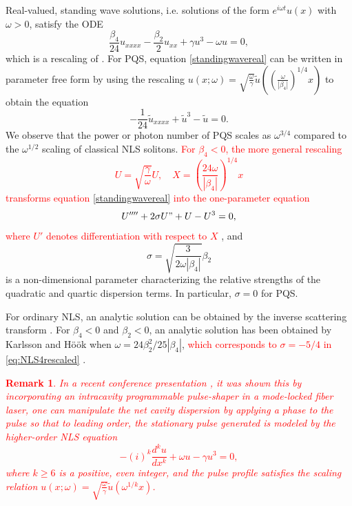 \documentclass[12pt]{elsarticle}
\newtheorem{remark}{Remark}
\newcommand{\revised}[1]{ \textcolor{red}{#1} }
\begin{document}
Real-valued, standing wave solutions, i.e. solutions of the form $e^{i \omega t} u(x)$ with $\omega > 0$, satisfy the ODE 
\begin{equation}\label{standingwavereal}
\frac{\beta_4}{24}u_{xxxx} - \frac{\beta_2}{2}u_{xx} + \gamma u^3 - \omega u = 0,
\end{equation}
which is a rescaling of \cite{champneys1998}. For PQS, equation \cref{standingwavereal} can be written in parameter free form by using the rescaling $
u(x; \omega) = \sqrt{\frac{\omega}{\gamma}} \tilde{u}
\left( \left(\frac{\omega}{|\beta_4|}\right)^{1/4}x \right)
$
to obtain the equation
\begin{equation}\label{PQSparfree}
-\frac{1}{24}\tilde{u}_{xxxx} + \tilde{u}^3 - \tilde{u} = 0.
\end{equation} 
We observe that the power or photon number of PQS scales as $\omega^{3/4}$ compared to the $\omega^{1/2}$ scaling of classical NLS solitons. \revised{For $\beta_4 < 0$, the more general rescaling \cite[Section VI]{Tam2020} 
\begin{equation}\label{rescaling}
U = \sqrt{\frac{\gamma}{\omega}} U, \quad
X = \left( \frac{24 \omega}{|\beta_4|}\right)^{1/4} x
\end{equation}
transforms equation \cref{standingwavereal} into the one-parameter equation
\begin{equation}\label{eq:NLS4rescaled}
U'''' + 2 \sigma U" +  U - U^3 = 0,
\end{equation}
where $U'$ denotes differentiation with respect to $X$}, and 
\begin{equation}\label{eq:sigma}
\sigma = \sqrt{\frac{3}{2 \omega |\beta_4| }}\beta_2
\end{equation}
is a non-dimensional parameter characterizing the relative strengths of the quadratic and quartic dispersion terms. In particular, $\sigma = 0$ for PQS.

For ordinary NLS, an analytic solution can be obtained by the inverse scattering transform \cite{Zak72}. For $\beta_4 < 0$ and $\beta_2 < 0$, an analytic solution has been obtained by Karlsson and H{\"o}{\"o}k \cite{KarllsonHook} when $\omega = 24 \beta_2^2 / 25 |\beta_4|$, \revised{which corresponds to $\sigma = -5/4$ in \cref{eq:NLS4rescaled}}.

\revised{
\begin{remark}
In a recent conference presentation \cite{Runge2020}, it was shown this by incorporating an intracavity programmable pulse-shaper in a mode-locked fiber laser, one can manipulate the net cavity dispersion by applying a phase to the pulse so that to leading order, the stationary pulse generated is modeled by the higher-order NLS equation
\begin{equation}\label{HONLS}
-(i)^k\frac{d^k u}{dx^k}+ \omega u - \gamma u^3 = 0,
\end{equation}
where $k \geq 6$ is a positive, even integer, and the pulse profile satisfies the scaling relation $u(x; \omega) = \sqrt{\frac{\omega}{\gamma}}\tilde{u}(\omega^{1/k}x)$.
\end{remark}
}
\end{document}
